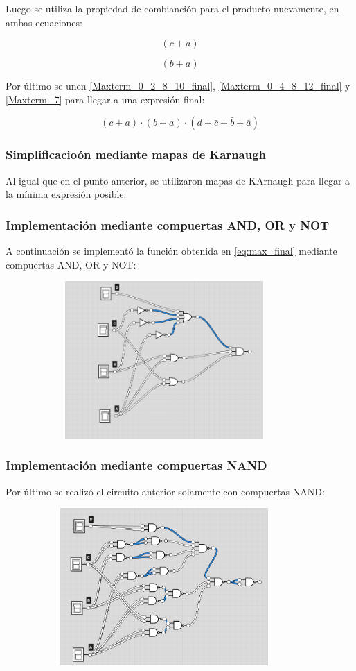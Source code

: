 Luego se utiliza la propiedad de combianción para el producto nuevamente, en ambas ecuaciones:

\begin{equation}\label{Maxterm_0_2_8_10_final}
(c + a) 
\end{equation}

\begin{equation}\label{Maxterm_0_4_8_12_final}
(b +a)
\end{equation}

Por último se unen \ref{Maxterm_0_2_8_10_final}, \ref{Maxterm_0_4_8_12_final} y \ref{Maxterm_7} para llegar a una expresión final:

\begin{equation}\label{eq:max_final}
\boxed{(c + a) \cdot (b +a) \cdot (d + \bar{c} + \bar{b} + \bar{a})}
\end{equation}

\subsubsection{Simplificacioón mediante mapas de Karnaugh}
Al igual que en el punto anterior, se utilizaron mapas de KArnaugh para llegar a la mínima expresión posible:


\subsubsection{Implementación mediante compuertas AND, OR y NOT}

A continuación se implementó la función obtenida en \ref{eq:max_final} mediante compuertas AND, OR y NOT:

\begin{figure}[H]
\centering
\includegraphics[width=10cm,height=6cm]{Ejercicio_2/circuitos/Ej2_parte2_logily.png}
\end{figure}

\subsubsection{Implementación mediante compuertas NAND}
Por último se realizó el circuito anterior solamente con compuertas NAND:
\begin{figure}[H]
\centering
\includegraphics[width=10cm,height=6cm]{Ejercicio_2/circuitos/Ej2_parte2_nand_logicly.png}
\end{figure}

%